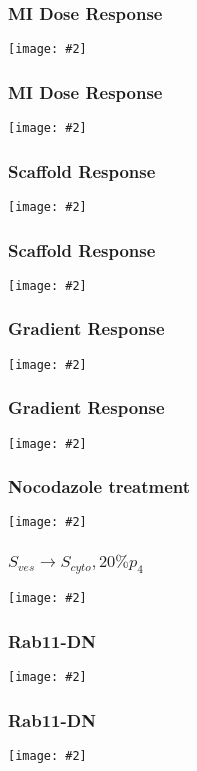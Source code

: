 \documentclass{beamer}
\newcommand{\plotslide}[2]{
  \begin{frame}
    \frametitle{#1}
    \centering
    \texttt{[image: \#2]}
  \end{frame}
}
\begin{document}
\plotslide{MI Dose Response}{../hao/dose_response_MI_t.png}
\plotslide{MI Dose Response}{InputVsMI.pdf}

\plotslide{Scaffold Response}{../hao/exp-MIvsS_t.png}
\plotslide{Scaffold Response}{ScaffoldVsMAPKppMI.pdf}

\plotslide{Gradient Response}{../hao/gradient_response_t.png}
\plotslide{Gradient Response}{GradientVsMI.pdf}

\plotslide{Nocodazole treatment}{../hao/noco_t.png}
\plotslide{$S_{ves} \rightarrow S_{cyto}, 20\%  p_4 $}{noco.pdf}

\plotslide{Rab11-DN}{../hao/Rab11DN_t.png}
\plotslide{Rab11-DN}{rab11dn.pdf}

\end{document}
